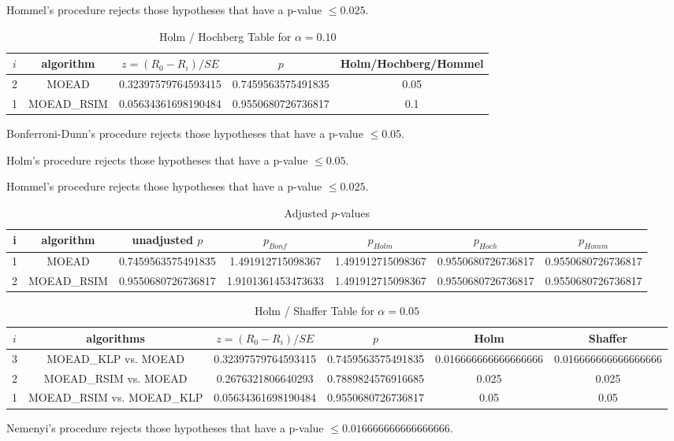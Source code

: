 \documentclass[a4paper,10pt]{article}
\begin{document}
\begin{landscape}
Hommel's procedure rejects those hypotheses that have a p-value $\le0.025$.


\begin{table}[!htp]
\centering\tiny
\caption{Holm / Hochberg Table for $\alpha=0.10$}
\begin{tabular}{ccccc}
$i$&algorithm&$z=(R_0 - R_i)/SE$&$p$&Holm/Hochberg/Hommel\\
\hline
2&MOEAD&0.32397579764593415&0.7459563575491835&0.05\\
1&MOEAD_RSIM&0.05634361698190484&0.9550680726736817&0.1\\
\hline
\end{tabular}
\end{table}
Bonferroni-Dunn's procedure rejects those hypotheses that have a p-value $\le0.05$.


Holm's procedure rejects those hypotheses that have a p-value $\le0.05$.


Hommel's procedure rejects those hypotheses that have a p-value $\le0.025$.


\begin{table}[!htp]
\centering\tiny
\caption{Adjusted $p$-values}
\begin{tabular}{ccccccc}
i&algorithm&unadjusted $p$&$p_{Bonf}$&$p_{Holm}$&$p_{Hoch}$&$p_{Homm}$\\
\hline
1&MOEAD&0.7459563575491835&1.491912715098367&1.491912715098367&0.9550680726736817&0.9550680726736817\\
2&MOEAD_RSIM&0.9550680726736817&1.9101361453473633&1.491912715098367&0.9550680726736817&0.9550680726736817\\
\hline
\end{tabular}
\end{table}

\begin{table}[!htp]
\centering\tiny
\caption{Holm / Shaffer Table for $\alpha=0.05$}
\begin{tabular}{cccccc}
$i$&algorithms&$z=(R_0 - R_i)/SE$&$p$&Holm&Shaffer\\
\hline
3&MOEAD_KLP vs. MOEAD&0.32397579764593415&0.7459563575491835&0.016666666666666666&0.016666666666666666\\
2&MOEAD_RSIM vs. MOEAD&0.2676321806640293&0.7889824576916685&0.025&0.025\\
1&MOEAD_RSIM vs. MOEAD_KLP&0.05634361698190484&0.9550680726736817&0.05&0.05\\
\hline
\end{tabular}
\end{table}
Nemenyi's procedure rejects those hypotheses that have a p-value $\le0.016666666666666666$.



\end{landscape}
\end{document}
